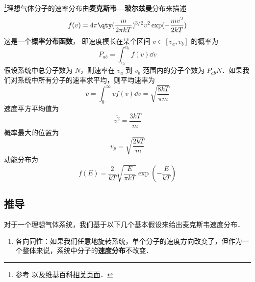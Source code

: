 
\begin{issues}
\issueDraft
\end{issues}

\footnote{参考 \cite{新热} 以及维基百科\href{https://en.wikipedia.org/wiki/Maxwell-Boltzmann_distribution}{相关页面}．}理想气体分子的速率分布由\textbf{麦克斯韦—玻尔兹曼}分布来描述
\begin{equation}
f(v) = 4\pi \qty(\frac{m}{2\pi kT})^{3/2} v^2 \exp(-\frac{mv^2}{2kT})
\end{equation}
这是一个\textbf{概率分布函数}， 即速度模长在某个区间 $v \in [v_a, v_b]$ 的概率为
\begin{equation}
P_{ab} = \int_{v_a}^{v_b} f(v) \dd{v}
\end{equation}
假设系统中总分子数为 $N$，则速率在 $v_a$ 到 $v_b$ 范围内的分子个数为 $P_{ab}N$．如果我们对系统中所有分子的速率求平均，则平均速率为
\begin{equation}
\bar v = \int_{0}^\infty v f(v)\dd v= \sqrt{\frac{8kT}{\pi m}}
\end{equation}
速度平方平均值为
\begin{equation}
\overline {v^2} = \frac{3kT}{m}
\end{equation}
概率最大的位置为
\begin{equation}
v_p = \sqrt{\frac{2kT}{m}}
\end{equation}
动能分布为
\begin{equation}
f(E) = \frac{2}{kT}\sqrt{\frac{E}{\pi kT}} \exp(-\frac{E}{kT})
\end{equation}

\subsection{推导}
对于一个理想气体系统，我们基于以下几个基本假设来给出麦克斯韦速度分布．

\begin{enumerate}
\item 各向同性：如果我们任意地旋转系统，单个分子的速度方向改变了，但作为一个整体来说，系统中分子的\textbf{速度分布}不改变．
\end{enumerate}


